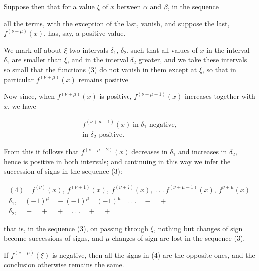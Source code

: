 
Suppose then that for a value $\xi$ of $x$ between $\alpha$ and $\beta$, in the sequence


all the terms, with the exception of the last, vanish, and suppose the last, $f^{(\nu+\mu)}(x)$, has, say, a positive value.

We mark off about $\xi$ two intervals $\delta_1$, $\delta_2$, such that all values of $x$ in the interval $\delta_1$ are smaller than $\xi$, and in the interval $\delta_2$ greater, and we take these intervals so small that the functions (3) do not vanish in them except at $\xi$, so that in particular $f^{(\nu+\mu)}(x)$ remains positive.

Now since, when $f^{(\nu+\mu)}(x)$ is positive, $f^{(\nu+\mu-1)}(x)$ increases together with $x$, we have

\[
\begin{array}{l}
f^{(\nu+\mu-1)}(x) \text{ in } \delta_1 \text{ negative,} \\
\text{in } \delta_2 \text{ positive.}
\end{array}
\]

From this it follows that $f^{(\nu+\mu-2)}(x)$ decreases in $\delta_1$ and increases in $\delta_2$, hence is positive in both intervals; and continuing in this way we infer the succession of signs in the sequence (3):

\[
\begin{array}{l}
(4)\quad f^{(\nu)}(x),\ f^{(\nu+1)}(x),\ f^{(\nu+2)}(x),\ .\ .\ .\ f^{(\nu+\mu-1)}(x),\ f^{\nu+\mu}(x) \\[4pt]
\delta_1,\quad (-1)^\mu \quad -(-1)^\mu \quad (-1)^\mu \quad .\ .\ . \quad - \quad + \\[2pt]
\delta_2,\quad + \quad + \quad + \quad .\ .\ . \quad + \quad +
\end{array}
\] %

that is, in the sequence (3), on passing through $\xi$, nothing but changes of sign become successions of signs, and $\mu$ changes of sign are lost in the sequence (3).

If $f^{(\nu+\mu)}(\xi)$ is negative, then all the signs in (4) are the opposite ones, and the conclusion otherwise remains the same.

